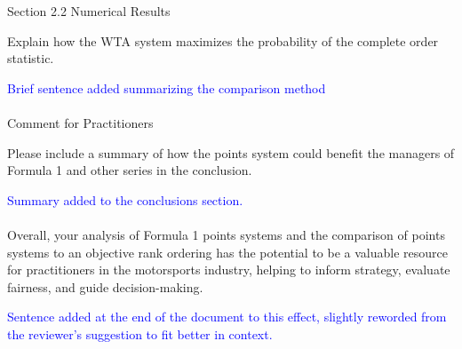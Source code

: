 \documentclass[12pt]{article}
\begin{document}
Section 2.2 Numerical Results

Explain how the WTA system maximizes the probability of the complete
order statistic.

\textcolor{blue}{Brief sentence added summarizing the comparison
  method}\\ \\


Comment for Practitioners

Please include a summary of how the points system could benefit the
managers of Formula 1 and other series in the conclusion.

\textcolor{blue}{Summary added to the conclusions section.}\\ \\

Overall, your analysis of Formula 1 points systems and the comparison
of points systems to an objective rank ordering has the potential to
be a valuable resource for practitioners in the motorsports industry,
helping to inform strategy, evaluate fairness, and guide
decision-making.

\textcolor{blue}{Sentence added at the end of the document to this
  effect, slightly reworded from the reviewer's suggestion to fit
  better in context.}
\end{document}
